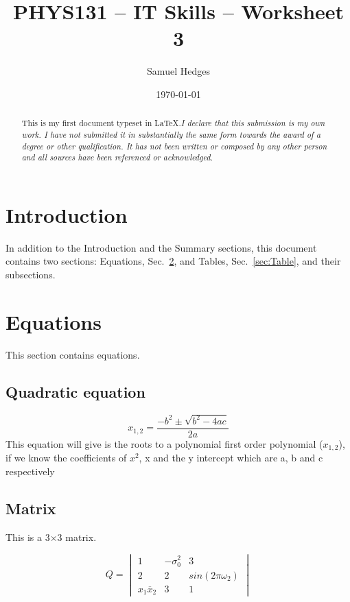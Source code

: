 \documentclass[12pt]{article}
\begin{document}
    \title{PHYS131 -- IT Skills -- Worksheet 3}
    \author{Samuel Hedges}
    \date{\today}
    \maketitle

    \begin{abstract}
    This is my first document typeset in \LaTeX.\textit{I declare that this submission is my own work. I have not submitted it in substantially the same form towards the award of a degree or other qualification. It has not been written or composed by any other person and all sources have been referenced or acknowledged.}
    \end{abstract}

    \tableofcontents

\section{Introduction}

In addition to the Introduction and the Summary sections, this document contains two  sections:  Equations, Sec.\ \ref{sec:Equations}, and Tables, Sec.\ \ref{sec:Table}, and their subsections.

\section{Equations}
\label{sec:Equations}

This section contains equations.
    \subsection{Quadratic equation}

$$x_{1,2} =\frac {-b^{2} \pm \sqrt{b^{2}-4ac}}{2a}$$
\textrm{This equation will give is the roots to a polynomial first order polynomial ($x_{1,2}$), if we know the coefficients of $x^{2}$, x and the y intercept which are a, b and c respectively}
    \subsection{Matrix}

This is a 3$\times$3 matrix.

$$ Q =\begin{vmatrix} 
1 & -\sigma_0^{2} & 3 \\
2 & 2 & sin(2\pi\omega_2)\\
x_1\overline{x}_2 & 3 & 1
\end{vmatrix}$$  
\end{document}
